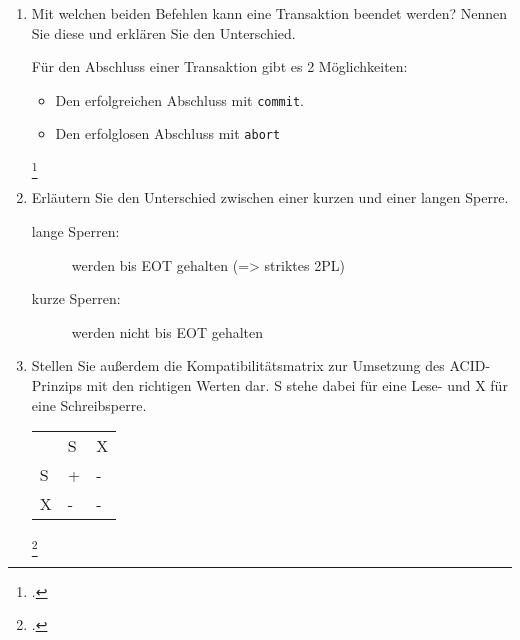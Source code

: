 \documentclass{lehramt-informatik-aufgabe}
\begin{document}
\begin{enumerate}

\item Mit welchen beiden Befehlen kann eine Transaktion beendet werden?
Nennen Sie diese und erklären Sie den Unterschied.

\begin{liAntwort}
Für den Abschluss einer Transaktion gibt es 2 Möglichkeiten:

\begin{itemize}
\item Den erfolgreichen Abschluss mit \texttt{commit}.
\item Den erfolglosen Abschluss mit \texttt{abort}
\end{itemize}\footcite[Kapitel 9.3, Seite 302-302]{kemper}
\end{liAntwort}


\item Erläutern Sie den Unterschied zwischen einer kurzen und einer
langen Sperre.

\begin{liAntwort}
\begin{description}
\item[lange Sperren:]

werden bis EOT gehalten (=> striktes 2PL)

\item[kurze Sperren:]

werden nicht bis EOT gehalten
\end{description}
\end{liAntwort}


\item Stellen Sie außerdem die Kompatibilitätsmatrix zur Umsetzung des
ACID-Prinzips mit den richtigen Werten dar. S stehe dabei für eine Lese-
und X für eine Schreibsperre.

\begin{liAntwort}
\begin{tabular}{lll}
  & S & X \\
S & + & - \\
X & - & - \\
\end{tabular}
\footcite[SX-Kompatibilitätsmatrix]{wiki:sperrverfahren}
\end{liAntwort}



\end{enumerate}
\end{document}
